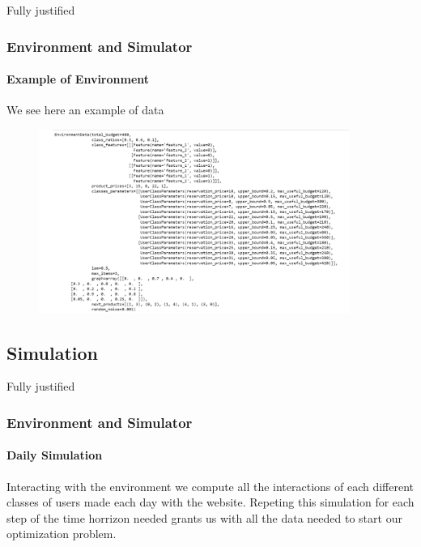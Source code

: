 \documentclass{beamer}
\begin{document}
\begin{frame}{Fully justified}

    \frametitle{Environment and Simulator}
    \framesubtitle{Example of Environment}

We see here an example of data     
      \begin{figure}[⟨t⟩]  
        \includegraphics[height=6cm]{img/Graphs/Example_environment.png}
            \end{figure}

\end {frame}


\subsection{Simulation}

\begin {frame}{Fully justified}

\frametitle{Environment and Simulator}
\framesubtitle{Daily Simulation}

Interacting with the environment we compute all the interactions of each different classes of users made each day with the website.
Repeting this simulation for each step of the time horrizon needed grants us with all the data needed to start our optimization problem.

\end{frame}

\end{document}
